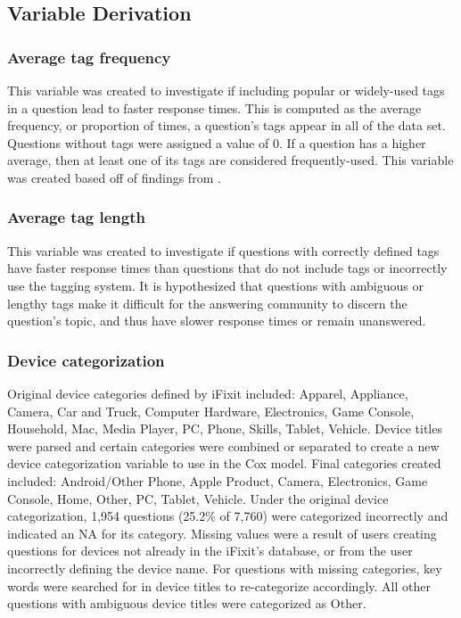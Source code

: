 \documentclass[preprint]{elsarticle}\usepackage[]{graphicx}\usepackage[]{color}
\begin{document}

\subsection{Variable Derivation}

\subsubsection{Average tag frequency}

This variable was created to investigate if including popular or widely-used tags in a question lead to faster response times. This is computed as the average frequency, or proportion of times, a question's tags appear in all of the data set. Questions without tags were assigned a value of 0.  If a question has a higher average, then at least one of its tags are considered frequently-used. This variable was created based off of findings from \cite{Bhat2014}. 


\subsubsection{Average tag length}

This variable was created to investigate if questions with correctly defined tags have faster response times than questions that do not include tags or incorrectly use the tagging system. It is hypothesized that questions with ambiguous or lengthy tags make it difficult for the answering community to discern the question's topic, and thus have slower response times or remain unanswered. 


\subsubsection{Device categorization}

Original device categories defined by iFixit included: Apparel, Appliance, Camera, Car and Truck, Computer Hardware, Electronics, Game Console, Household, Mac, Media Player, PC, Phone, Skills, Tablet, Vehicle. Device titles were parsed and certain categories were combined or separated to create a new device categorization variable to use in the Cox model. Final categories created included: Android/Other Phone, Apple Product, Camera, Electronics, Game Console, Home, Other, PC, Tablet, Vehicle. Under the original device categorization, 1,954 questions (25.2\% of 7,760) were categorized incorrectly and indicated an NA for its category. Missing values were a result of users creating questions for devices not already in the iFixit's database, or from the user incorrectly defining the device name. For questions with missing categories, key words were searched for in device titles to re-categorize accordingly. All other questions with ambiguous device titles were categorized as Other. 
\end{document}

